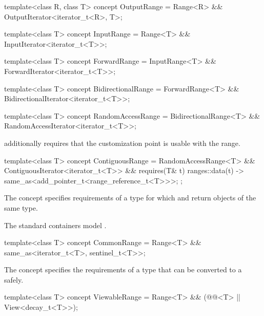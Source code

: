 %
%
%
%
%
\begin{itemdecl}
template<class R, class T>
  concept OutputRange =
    Range<R> && OutputIterator<iterator_t<R>, T>;

template<class T>
  concept InputRange =
    Range<T> && InputIterator<iterator_t<T>>;

template<class T>
  concept ForwardRange =
    InputRange<T> && ForwardIterator<iterator_t<T>>;

template<class T>
  concept BidirectionalRange =
    ForwardRange<T> && BidirectionalIterator<iterator_t<T>>;

template<class T>
  concept RandomAccessRange =
    BidirectionalRange<T> && RandomAccessIterator<iterator_t<T>>;
\end{itemdecl}

\pnum
{} additionally requires that
the  customization point
is usable with the range.

%
\begin{itemdecl}
template<class T>
  concept ContiguousRange =
    RandomAccessRange<T> && ContiguousIterator<iterator_t<T>> &&
    requires(T& t) {
      { ranges::data(t) } -> same_as<add_pointer_t<range_reference_t<T>>>;
    };
\end{itemdecl}

\pnum
The  concept specifies requirements of
a  type for which  and
 return objects of the same type.
\begin{example}
The standard containers model .
\end{example}

%
\begin{itemdecl}
template<class T>
  concept CommonRange =
    Range<T> && same_as<iterator_t<T>, sentinel_t<T>>;
\end{itemdecl}

\pnum
The  concept specifies the requirements of a
 type that can be converted to a  safely.

%
\begin{itemdecl}
template<class T>
  concept ViewableRange =
    Range<T> && (@@<T> || View<decay_t<T>>);
\end{itemdecl}

